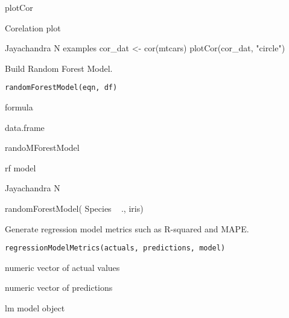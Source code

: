 \documentclass[a4paper]{book}
\begin{document}
%
\begin{Details}\relax
plotCor
\end{Details}
%
\begin{Value}
Corelation plot
\end{Value}
%
\begin{Author}\relax
Jayachandra N
examples
cor\_dat <- cor(mtcars)
plotCor(cor\_dat, "circle")
\end{Author}
%
\begin{Description}\relax
Build Random Forest Model.
\end{Description}
%
\begin{Usage}
\begin{verbatim}
randomForestModel(eqn, df)
\end{verbatim}
\end{Usage}
%
\begin{Arguments}
\begin{ldescription}
\item[\code{eqn}] formula

\item[\code{df}] data.frame
\end{ldescription}
\end{Arguments}
%
\begin{Details}\relax
randoMForestModel
\end{Details}
%
\begin{Value}
rf model
\end{Value}
%
\begin{Author}\relax
Jayachandra N
\end{Author}
%
\begin{Examples}
\begin{ExampleCode}
randomForestModel( Species ~ .,  iris)
\end{ExampleCode}
\end{Examples}
%
\begin{Description}\relax
Generate regression model metrics such as R-squared and MAPE.
\end{Description}
%
\begin{Usage}
\begin{verbatim}
regressionModelMetrics(actuals, predictions, model)
\end{verbatim}
\end{Usage}
%
\begin{Arguments}
\begin{ldescription}
\item[\code{actuals}] numeric vector of actual values

\item[\code{predictions}] numeric vector of predictions

\item[\code{model}] lm model object
\end{ldescription}
\end{Arguments}
\end{document}
